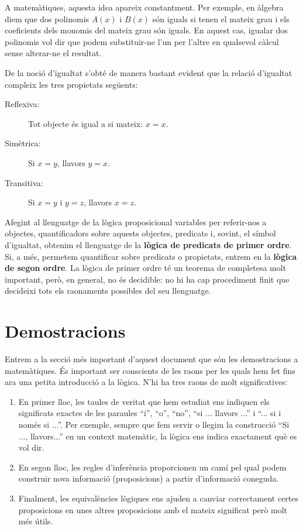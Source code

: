 A matemàtiques, aquesta idea apareix constantment. Per exemple, en àlgebra
diem que dos polinomis $A(x)$ i $B(x)$ són iguals si tenen el mateix grau i
els coeficients dels monomis del mateix grau són iguals. En aquest cas,
igualar dos polinomis vol dir que podem substituir-ne l'un per l'altre en
qualsevol càlcul sense alterar-ne el resultat.

De la noció d'igualtat s'obté de manera bastant evident que
la relació d'igualtat compleix les tres propietats següents:

\begin{description}
\item[Reflexiva:] Tot objecte és igual a si mateix: $x=x$.

\item[Simètrica:] Si $x=y$, llavors $y=x$.

\item[Transitiva:] Si $x=y$ i $y=z$, llavors $x=z$.
\end{description}

Afegint al llenguatge de la lògica proposicional variables per referir-nos a
objectes, quantificadors sobre aquests objectes, predicats i, sovint, el
símbol d'igualtat, obtenim el llenguatge de la \textbf{lògica de predicats de
primer ordre}. Si, a més, permetem quantificar sobre predicats o propietats,
entrem en la \textbf{lògica de segon ordre}. La lògica de primer ordre té un
teorema de completesa molt important, però, en general, no és decidible: no hi
ha cap procediment finit que decideixi tots els raonaments possibles del seu
llenguatge.

\section{Demostracions}

Entrem a la secció més important d'aquest document que són les
demostracions a matemàtiques. És important ser conscients de les
raons per les quals hem fet fins ara una petita introducció a la lògica. N'hi ha tres raons de molt significatives:

\begin{enumerate}
\item En primer lloc, les taules de veritat que hem estudiat ens indiquen
els significats exactes de les paraules \enquote{i}, \enquote{o}, \enquote{no}, \enquote{si ... llavors ...}
i \enquote{... si i només si ...}. Per exemple, sempre que fem servir o llegim
la construcció \enquote{Si ..., llavors...} en un context matemàtic, la lògica ens indica exactament què es vol dir.

\item En segon lloc, les regles d'inferència proporcionen un camí
pel qual podem construir nova informació (proposicions) a partir
d'informació coneguda.

\item Finalment, les equivalències lògiques ens ajuden a canviar
correctament certes proposicions en unes altres proposicions amb el mateix
significat però molt més útils.
\end{enumerate}

